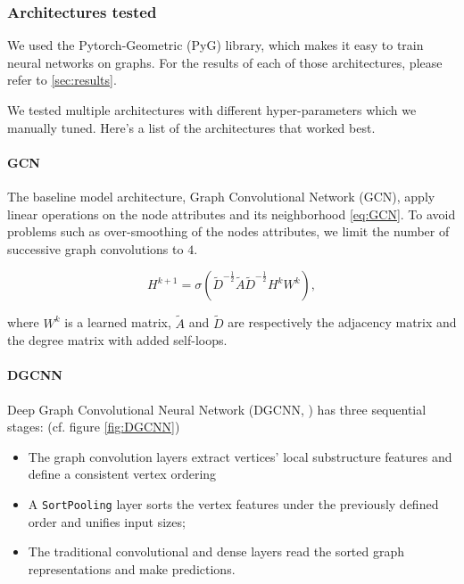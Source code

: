 \documentclass[final]{cvpr}
\begin{document}
\subsubsection{Architectures tested}

We used the Pytorch-Geometric (PyG) library, which makes it easy to train neural networks on graphs. For the results of each of those architectures, please refer to \ref{sec:results}.

We tested multiple architectures with different hyper-parameters which we manually tuned. Here's a list of the architectures that worked best. 

\paragraph{GCN}

The baseline model architecture, Graph Convolutional Network (GCN), apply linear operations on the node attributes and its neighborhood \ref{eq:GCN}. To avoid problems such as over-smoothing of the nodes attributes, we limit the number of successive graph convolutions to $4$.

\begin{equation} \label{eq:GCN}
    H^{k+1} = \sigma(\tilde{D} ^{-\frac{1}{2}}\tilde{A}  \tilde{D} ^{-\frac{1}{2}} H^k W^k), 
\end{equation}

where $W^k$ is a learned matrix, $\tilde{A}$ and $\tilde{D}$ are respectively the adjacency matrix and the degree matrix with added self-loops.

\paragraph{DGCNN}

Deep Graph Convolutional Neural Network (DGCNN, \cite{dgcnn}) has three sequential stages: (cf. figure \ref{fig:DGCNN})

\begin{itemize}
    \item The graph convolution layers extract vertices’ local substructure features and define a consistent vertex ordering
    \item A \texttt{SortPooling} layer sorts the vertex features under the previously defined order and unifies input sizes;
    \item The traditional convolutional and dense layers read the sorted graph representations and make predictions.
\end{itemize}
\end{document}
